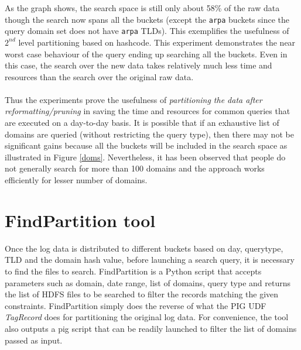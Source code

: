 \documentclass[11pt,a4paper]{article}
\begin{document}
\noindent
As the graph shows, the search space is still only about 58\% of the raw data though the search now spans all the buckets (except the \texttt{arpa} buckets since the query domain set does not have \texttt{arpa} TLDs). This exemplifies the usefulness of $2^{nd}$ level partitioning based on hashcode. This experiment demonstrates the near worst case behaviour of the query ending up searching all the buckets. Even in this case, the search over the new data takes relatively much less time and resources than the search over the original raw data.
\\\\
Thus the experiments prove the usefulness of \textit{partitioning the data after reformatting/pruning} in saving the time and resources for common queries that are executed on a day-to-day basis. It is possible that if an exhaustive list of domains are queried (without restricting the query type), then there may not be significant gains because all the buckets will be included in the search space as illustrated in Figure \ref{doms}. Nevertheless, it has been observed that people do not generally search for more than 100 domains and the approach works efficiently for lesser number of domains.

\section{FindPartition tool}
Once the log data is distributed to different buckets based on day, querytype, TLD and the domain hash value, before launching a search query, it is necessary to find the files to search. FindPartition is a Python script that accepts parameters such as domain, date range, list of domains, query type and returns the list of HDFS files to be searched to filter the records matching the given constraints. FindPartition simply does the reverse of what the PIG UDF \textit{TagRecord} does for partitioning the original log data. For convenience, the tool also outputs a pig script that can be readily launched to filter the list of domains passed as input.
\end{document}
